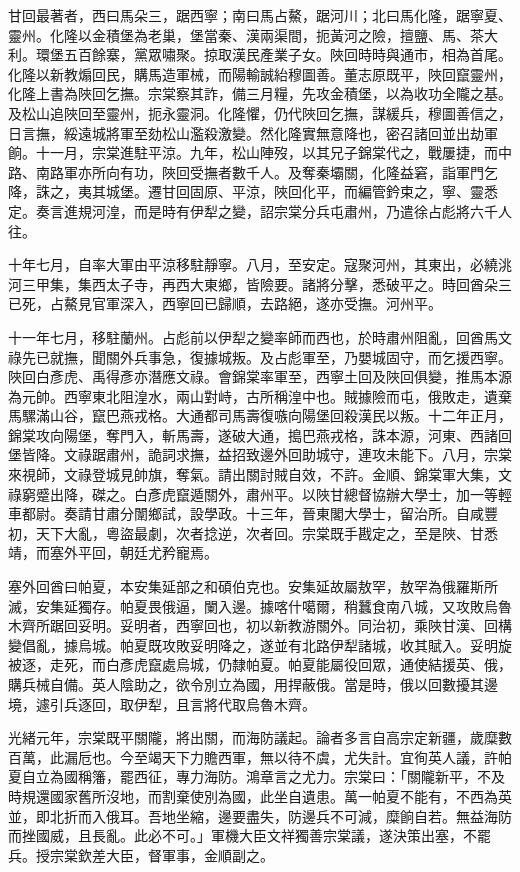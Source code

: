 \begin{pinyinscope}
甘回最著者，西曰馬朵三，踞西寧；南曰馬占鰲，踞河川；北曰馬化隆，踞寧夏、靈州。化隆以金積堡為老巢，堡當秦、漢兩渠間，扼黃河之險，擅鹽、馬、茶大利。環堡五百餘寨，黨眾嘯聚。掠取漢民產業子女。陜回時時與通市，相為首尾。化隆以新教煽回民，購馬造軍械，而陽輸誠紿穆圖善。董志原既平，陜回竄靈州，化隆上書為陜回乞撫。宗棠察其詐，備三月糧，先攻金積堡，以為收功全隴之基。及松山追陜回至靈州，扼永靈洞。化隆懼，仍代陜回乞撫，謀緩兵，穆圖善信之，日言撫，綏遠城將軍至劾松山濫殺激變。然化隆實無意降也，密召諸回並出劫軍餉。十一月，宗棠進駐平涼。九年，松山陣歿，以其兄子錦棠代之，戰屢捷，而中路、南路軍亦所向有功，陜回受撫者數千人。及奪秦壩關，化隆益窘，詣軍門乞降，誅之，夷其城堡。遷甘回固原、平涼，陜回化平，而編管鈐束之，寧、靈悉定。奏言進規河湟，而是時有伊犁之變，詔宗棠分兵屯肅州，乃遣徐占彪將六千人往。

十年七月，自率大軍由平涼移駐靜寧。八月，至安定。寇聚河州，其東出，必繞洮河三甲集，集西太子寺，再西大東鄉，皆險要。諸將分擊，悉破平之。時回酋朵三已死，占鰲見官軍深入，西寧回已歸順，去路絕，遂亦受撫。河州平。

十一年七月，移駐蘭州。占彪前以伊犁之變率師而西也，於時肅州阻亂，回酋馬文祿先已就撫，聞關外兵事急，復據城叛。及占彪軍至，乃嬰城固守，而乞援西寧。陜回白彥虎、禹得彥亦潛應文祿。會錦棠率軍至，西寧土回及陜回俱變，推馬本源為元帥。西寧東北阻湟水，兩山對峙，古所稱湟中也。賊據險而屯，俄敗走，遺棄馬騾滿山谷，竄巴燕戎格。大通都司馬壽復嗾向陽堡回殺漢民以叛。十二年正月，錦棠攻向陽堡，奪門入，斬馬壽，遂破大通，搗巴燕戎格，誅本源，河東、西諸回堡皆降。文祿踞肅州，詭詞求撫，益招致邊外回助城守，連攻未能下。八月，宗棠來視師，文祿登城見帥旗，奪氣。請出關討賊自效，不許。金順、錦棠軍大集，文祿窮蹙出降，磔之。白彥虎竄遁關外，肅州平。以陜甘總督協辦大學士，加一等輕車都尉。奏請甘肅分闈鄉試，設學政。十三年，晉東閣大學士，留治所。自咸豐初，天下大亂，粵盜最劇，次者捻逆，次者回。宗棠既手戡定之，至是陜、甘悉靖，而塞外平回，朝廷尤矜寵焉。

塞外回酋曰帕夏，本安集延部之和碩伯克也。安集延故屬敖罕，敖罕為俄羅斯所滅，安集延獨存。帕夏畏俄逼，闌入邊。據喀什噶爾，稍蠶食南八城，又攻敗烏魯木齊所踞回妥明。妥明者，西寧回也，初以新教游關外。同治初，乘陜甘漢、回構變倡亂，據烏城。帕夏既攻敗妥明降之，遂並有北路伊犁諸城，收其賦入。妥明旋被逐，走死，而白彥虎竄處烏城，仍隸帕夏。帕夏能屬役回眾，通使結援英、俄，購兵械自備。英人陰助之，欲令別立為國，用捍蔽俄。當是時，俄以回數擾其邊境，遽引兵逐回，取伊犁，且言將代取烏魯木齊。

光緒元年，宗棠既平關隴，將出關，而海防議起。論者多言自高宗定新疆，歲糜數百萬，此漏卮也。今至竭天下力贍西軍，無以待不虞，尤失計。宜徇英人議，許帕夏自立為國稱籓，罷西征，專力海防。鴻章言之尤力。宗棠曰：「關隴新平，不及時規還國家舊所沒地，而割棄使別為國，此坐自遺患。萬一帕夏不能有，不西為英並，即北折而入俄耳。吾地坐縮，邊要盡失，防邊兵不可減，糜餉自若。無益海防而挫國威，且長亂。此必不可。」軍機大臣文祥獨善宗棠議，遂決策出塞，不罷兵。授宗棠欽差大臣，督軍事，金順副之。


\end{pinyinscope}
